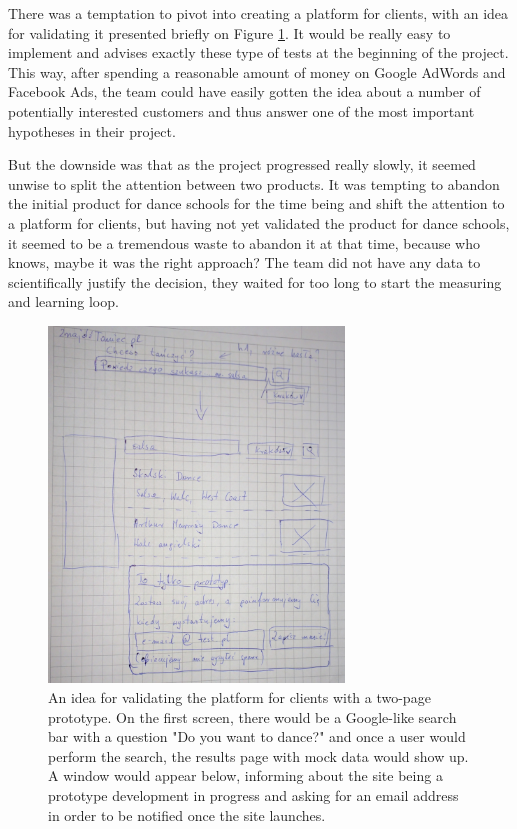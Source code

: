 \documentclass{article}
\begin{document}
There was a temptation to pivot into creating a platform for clients, with an idea for validating it presented briefly on Figure \ref{fig:znajdz-taniec}. It would be really easy to implement and \cite{klein2013ux} advises exactly these type of tests at the beginning of the project. This way, after spending a reasonable amount of money on Google AdWords and Facebook Ads, the team could have easily gotten the idea about a number of potentially interested customers and thus answer one of the most important hypotheses in their project.

But the downside was that as the project progressed really slowly, it seemed unwise to split the attention between two products. It was tempting to abandon the initial product for dance schools for the time being and shift the attention to a platform for clients, but having not yet validated the product for dance schools, it seemed to be a tremendous waste to abandon it at that time, because who knows, maybe it was the right approach? The team did not have any data to scientifically justify the decision, they waited for too long to start the measuring and learning loop.

\begin{figure}[h]
    \centering
    \includegraphics[width=0.7\textwidth]{znajdz-taniec}
    \caption{An idea for validating the platform for clients with a two-page prototype. On the first screen, there would be a Google-like search bar with a question "Do you want to dance?" and once a user would perform the search, the results page with mock data would show up. A window would appear below, informing about the site being a prototype development in progress and asking for an email address in order to be notified once the site launches.}
    \label{fig:znajdz-taniec} 
\end{figure}
\end{document}
